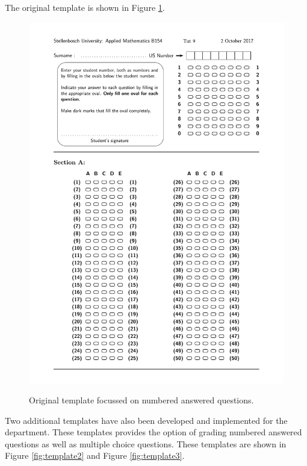 The original template is shown in Figure \ref{fig:template1}. 
\begin{figure}
  \centering
  \includegraphics[width=12cm]{template1}\\
  \caption{Original template focussed on numbered answered questions.}
  \label{fig:template1}
\end{figure}
Two additional templates have also been developed and implemented for the department. These templates provides the option of grading numbered answered questions as well as multiple choice questions. These templates are shown in Figure \ref{fig:template2} and Figure \ref{fig:template3}.

